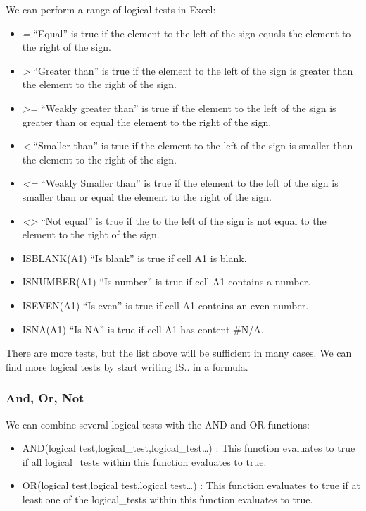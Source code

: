 \documentclass[]{book}
\providecommand{\tightlist}{%
  \setlength{\itemsep}{0pt}\setlength{\parskip}{0pt}}
\begin{document}
We can perform a range of logical tests in Excel:

\begin{itemize}
\tightlist
\item
  \emph{=} ``Equal'' is true if the element to the left of the sign equals the element to the right of the sign.
\item
  \emph{\textgreater{}} ``Greater than'' is true if the element to the left of the sign is greater than the element to the right of the sign.
\item
  \emph{\textgreater=} ``Weakly greater than'' is true if the element to the left of the sign is greater than or equal the element to the right of the sign.
\item
  \emph{\textless{}} ``Smaller than'' is true if the element to the left of the sign is smaller than the element to the right of the sign.
\item
  \emph{\textless=} ``Weakly Smaller than'' is true if the element to the left of the sign is smaller than or equal the element to the right of the sign.
\item
  \emph{\textless\textgreater{}} ``Not equal'' is true if the to the left of the sign is not equal to the element to the right of the sign.
\item
  ISBLANK(A1) ``Is blank'' is true if cell A1 is blank.
\item
  ISNUMBER(A1) ``Is number'' is true if cell A1 contains a number.
\item
  ISEVEN(A1) ``Is even'' is true if cell A1 contains an even number.
\item
  ISNA(A1) ``Is NA'' is true if cell A1 has content \#N/A.
\end{itemize}

There are more tests, but the list above will be sufficient in many cases. We can find more logical tests by start writing IS.. in a formula.

\hypertarget{and-or-not}{%
\subsubsection*{And, Or, Not}\label{and-or-not}}

We can combine several logical tests with the AND and OR functions:

\begin{itemize}
\item
  AND(logical test,logical\_test,logical\_test\ldots) : This function evaluates to true if all logical\_tests within this function evaluates to true.
\item
  OR(logical test,logical test,logical test\ldots) : This function evaluates to true if at least one of the logical\_tests within this function evaluates to true.
\end{itemize}
\end{document}
